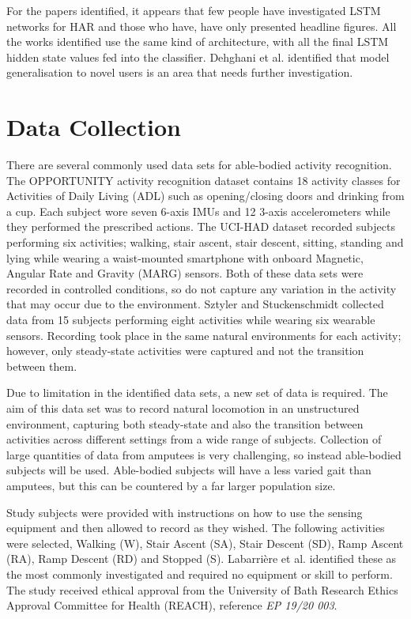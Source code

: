 \documentclass[sensors,article,submit,moreauthors,pdftex]{Definitions/mdpi}
\begin{document}
For the papers identified, it appears that few people have investigated LSTM networks for HAR and those who have, have only presented headline figures. All the works identified use the same kind of architecture, with all the final LSTM hidden state values fed into the classifier. Dehghani et al. identified that model generalisation to novel users is an area that needs further investigation\cite{Dehghani2019}.

\section{Data Collection}
\label{sec:data_collection}
There are several commonly used data sets for able-bodied activity recognition. The OPPORTUNITY activity recognition dataset\cite{roggan2010} contains 18 activity classes for Activities of Daily Living (ADL) such as opening/closing doors and drinking from a cup. Each subject wore seven 6-axis IMUs and 12 3-axis accelerometers while they performed the prescribed actions. The UCI-HAD dataset\cite{Anguita2013} recorded subjects performing six activities; walking, stair ascent, stair descent, sitting, standing and lying while wearing a waist-mounted smartphone with onboard Magnetic, Angular Rate and Gravity (MARG) sensors. Both of these data sets were recorded in controlled conditions, so do not capture any variation in the activity that may occur due to the environment. Sztyler and Stuckenschmidt collected data from 15 subjects performing eight activities while wearing six wearable sensors. Recording took place in the same natural environments for each activity; however, only steady-state activities were captured and not the transition between them\cite{Sztyler2017}.

Due to limitation in the identified data sets, a new set of data is required. The aim of this data set was to record natural locomotion in an unstructured environment, capturing both steady-state and also the transition between activities across different settings from a wide range of subjects. Collection of large quantities of data from amputees is very challenging, so instead able-bodied subjects will be used. Able-bodied subjects will have a less varied gait than amputees, but this can be countered by a far larger population size.

Study subjects were provided with instructions on how to use the sensing equipment and then allowed to record as they wished. The following activities were selected, Walking (W), Stair Ascent (SA), Stair Descent (SD), Ramp Ascent (RA), Ramp Descent (RD) and Stopped (S). Labarri\`ere et al. identified these as the most commonly investigated and required no equipment or skill to perform\cite{Labarriere2020}. The study received ethical approval from the University of Bath Research Ethics Approval Committee for Health (REACH), reference \textit{EP 19/20 003}.
\end{document}
